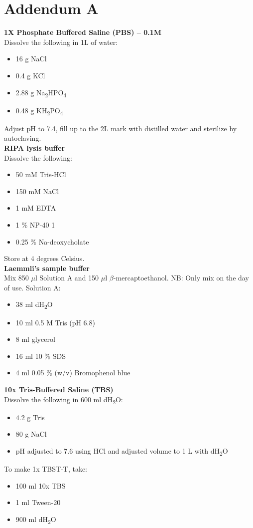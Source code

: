 \chapter*{Addendum A}\label{addendum}

\noindent
\textbf{1X Phosphate Buffered Saline (PBS) – 0.1M} \\
Dissolve the following in 1L of water:
\begin{itemize}
\item 16 g NaCl 
\item 0.4 g KCl 
\item 2.88 g Na\textsubscript{2}HPO\textsubscript{4} 
\item 0.48 g KH\textsubscript{2}PO\textsubscript{4} 
\end{itemize}
Adjust pH to 7.4, fill up to the 2L mark with distilled water and sterilize by autoclaving. \\

\noindent
\textbf{RIPA lysis buffer} \\
Dissolve the following:
\begin{itemize}
\item 50 mM Tris-HCl
\item 150 mM NaCl 
\item 1 mM EDTA 
\item 1 \% NP-40 1
\item 0.25 \% Na-deoxycholate 
\end{itemize}
Store at 4 degrees Celsius. \\

\noindent
\textbf{Laemmli’s sample buffer} \\
Mix 850 $\mu$l Solution A and 150 $\mu$l $\beta$-mercaptoethanol. NB: Only mix on the day of use. Solution A:
\begin{itemize}
\item 38 ml dH\textsubscript{2}O
\item 10 ml 0.5 M Tris (pH 6.8)
\item 8 ml glycerol
\item 16 ml 10 \% SDS
\item 4 ml 0.05 \% (w/v) Bromophenol blue
\end{itemize}

\noindent
\textbf{10x Tris-Buffered Saline (TBS)} \\
Dissolve the following in 600 ml dH\textsubscript{2}O:
\begin{itemize}
\item 4.2 g Tris
\item 80 g NaCl   
\item pH adjusted to 7.6 using HCl and adjusted volume to 1 L with dH\textsubscript{2}O
\end{itemize}
\noindent
To make 1x TBST-T, take:
\begin{itemize}
\item 100 ml 10x TBS 
\item 1 ml Tween-20
\item 900 ml dH\textsubscript{2}O
\end{itemize}

